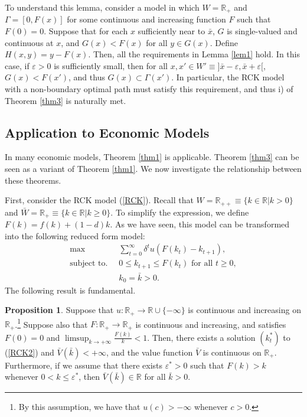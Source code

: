 \documentclass[a4paper,12pt]{article}
\theoremstyle{definition}
\newtheorem{prop}{Proposition}
\begin{document}
To understand this lemma, consider a model in which $W=\mathbb{R}_+$ and $\Gamma=[0,F(x)]$ for some continuous and increasing function $F$ such that $F(0)=0$. Suppose that for each $x$ sufficiently near to $\bar{x}$, $G$ is single-valued and continuous at $x$, and $G(x)<F(x)$ for all $y\in G(x)$. Define $H(x,y)=y-F(x)$. Then, all the requirements in Lemma \ref{lem1} hold. In this case, if $\varepsilon>0$ is sufficiently small, then for all $x,x'\in W'\equiv ]\bar{x}-\varepsilon,\bar{x}+\varepsilon[$, $G(x)<F(x')$, and thus $G(x)\subset \Gamma(x')$. In particular, the RCK model with a non-boundary optimal path must satisfy this requirement, and thus i) of Theorem \ref{thm3} is naturally met.





\subsection{Application to Economic Models}
In many economic models, Theorem \ref{thm1} is applicable. Theorem \ref{thm3} can be seen as a variant of Theorem \ref{thm1}. We now investigate the relationship between these theorems.

First, consider the RCK model (\ref{RCK}). Recall that $W=\mathbb{R}_{++}\equiv \{k\in \mathbb{R}|k>0\}$ and $\bar{W}=\mathbb{R}_+\equiv \{k\in \mathbb{R}|k\ge 0\}$. To simplify the expression, we define $F(k)=f(k)+(1-d)k$. As we have seen, this model can be transformed into the following reduced form model:
\begin{align}
\max~~~~~&~\sum_{t=0}^{\infty}\delta^tu(F(k_t)-k_{t+1}),\nonumber \\
\mbox{subject to. }&~0\le k_{t+1}\le F(k_t)\mbox{ for all }t\ge 0,\label{RCK2}\\
&~k_0=\bar{k}>0.\nonumber
\end{align}
The following result is fundamental.

\begin{prop}\label{prop7}
Suppose that $u:\mathbb{R}_+\to \mathbb{R}\cup \{-\infty\}$ is continuous and increasing on $\mathbb{R}_+$.\footnote{By this assumption, we have that $u(c)>-\infty$ whenever $c>0$.} Suppose also that $F:\mathbb{R}_+\to \mathbb{R}_+$ is continuous and increasing, and satisfies $F(0)=0$ and $\limsup_{k\to +\infty}\frac{F(k)}{k}<1$. Then, there exists a solution $(k_t^*)$ to (\ref{RCK2}) and $\bar{V}(\bar{k})<+\infty$, and the value function $\bar{V}$ is continuous on $\mathbb{R}_+$. Furthermore, if we assume that there exists $\varepsilon^*>0$ such that $F(k)>k$ whenever $0<k\le \varepsilon^*$, then $\bar{V}(\bar{k})\in \mathbb{R}$ for all $\bar{k}>0$.
\end{prop}
\end{document}
